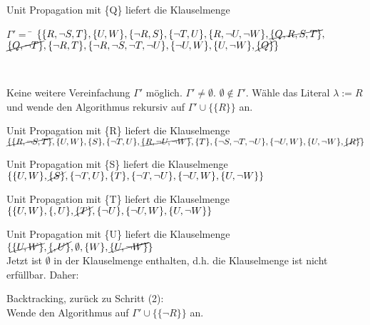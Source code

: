 \documentclass[a4paper,10pt]{article}
\begin{document}
	\begin{compactenum} [(1)]
		\item Unit Propagation mit \{Q\} liefert die Klauselmenge \\
		\begin{tabbing}
			$ \Gamma' =$ \= $ \{\{R,\lnot S,T\},\{U,W\},\{\lnot R,S\},\{\lnot T,U\},\{R,\lnot U,\lnot W\},\cancel{\{Q,R,S,T\}},$ \\
		\> $\cancel{\{Q,\lnot T\}},\{\lnot R,T\},\{\lnot R,\lnot S,\lnot T,\lnot U\},\{\lnot U,W\},\{U,\lnot W\},\cancel{\{Q\}}\} $
		\end{tabbing} \
		
		\item Keine weitere Vereinfachung $ \Gamma' $ möglich. $ \Gamma' \neq \emptyset $. $ \emptyset \not\in \Gamma'.$ Wähle das Literal $ \lambda := R $ und wende den Algorithmus rekursiv auf $ \Gamma' \cup \{\{R\}\} $ an.\\
		
		\item Unit Propagation mit \{R\} liefert die Klauselmenge \\
		$ \cancel{\{\{R,\lnot S,T\}},\{U,W\},\{S\},\{\lnot T,U\},\cancel{\{R,\lnot U,\lnot W\}}, \{T\},\{\lnot S,\lnot T,\lnot U\},\{\lnot U,W\},\{U,\lnot W\}, \cancel{\{R\}} \} $ \\
		
		\item Unit Propagation mit \{S\} liefert die Klauselmenge \\
		$ \{\{U,W\},\cancel{\{S\}},\{\lnot T,U\}, \{T\},\{\lnot T,\lnot U\},\{\lnot U,W\},\{U,\lnot W\}\} $\\
		
		\item Unit Propagation mit \{T\} liefert die Klauselmenge \\
		$ \{\{U,W\},\{,U\}, \cancel{\{T\}},\{\lnot U\},\{\lnot U,W\},\{U,\lnot W\}\} $\\
		
		\item Unit Propagation mit \{U\} liefert die Klauselmenge \\
		$ \{\cancel{\{U,W\}},\cancel{\{,U\}}, \emptyset,\{W\},\cancel{\{U,\lnot W\}}\} $ \\
		Jetzt ist $ \emptyset $ in der Klauselmenge enthalten, d.h. die Klauselmenge ist nicht erfüllbar. Daher: \\
		
		\item Backtracking, zurück zu Schritt (2): \\
		Wende den Algorithmus auf $ \Gamma' \cup \{\{\lnot R\}\} $ an.\\
		

\end{compactenum}
\end{document}
